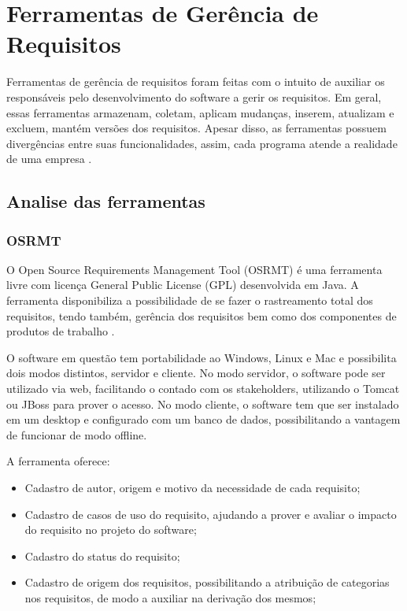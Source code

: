 \chapter[Ferramentas de Gerência de Requisitos]{Ferramentas de Gerência de Requisitos}

Ferramentas de gerência de requisitos foram feitas com o intuito de auxiliar os responsáveis pelo desenvolvimento do software a gerir os requisitos. Em geral, essas ferramentas armazenam, coletam, aplicam mudanças, inserem, atualizam e excluem, mantém versões dos requisitos. Apesar disso, as ferramentas possuem divergências entre suas funcionalidades, assim, cada programa atende a realidade de uma empresa \cite{ananias2009}.

\section{Analise das ferramentas}

\subsection{OSRMT}
O Open Source Requirements Management Tool (OSRMT) é uma ferramenta livre com licença General Public License (GPL) desenvolvida em Java. A ferramenta disponibiliza a possibilidade de se fazer o rastreamento total dos requisitos, tendo também, gerência dos requisitos bem como dos componentes de produtos de trabalho \cite{ananias2009}.

O software em questão tem portabilidade ao Windows, Linux e Mac e possibilita dois modos distintos, servidor e cliente. No modo servidor, o software pode ser utilizado via web, facilitando o contado com os stakeholders, utilizando o Tomcat ou JBoss para prover o acesso. No modo cliente, o software tem que ser instalado em um desktop e configurado com um banco de dados, possibilitando a vantagem de funcionar de modo offline.

A ferramenta oferece:
\begin{itemize}
    \item Cadastro de autor, origem e motivo da necessidade de cada requisito;
    \item Cadastro de casos de uso do requisito, ajudando a prover e avaliar o impacto do requisito no projeto do software;
    \item Cadastro do status do requisito;
    \item Cadastro de origem dos requisitos, possibilitando a atribuição de categorias nos requisitos, de modo a auxiliar na derivação dos mesmos;
\end{itemize}
               
